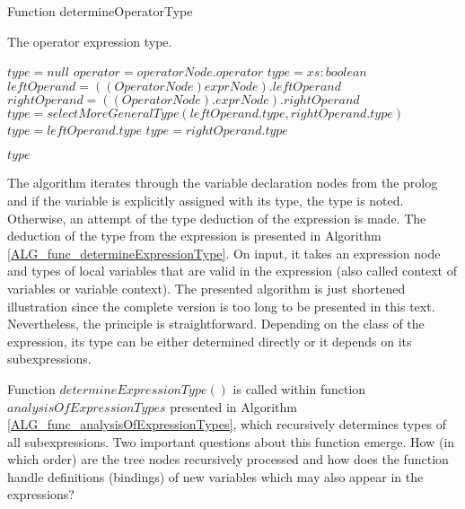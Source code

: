 
\begin{algorithm}
\caption{Function determineOperatorType}
\label{ALG_func_determineOperatorType}
\begin{algorithmic}[1]
\ENSURE The operator expression type.

\STATE $type = null$
\STATE $operator = operatorNode.operator$
    \STATE $type = xs:boolean$
    \STATE $leftOperand = ((OperatorNode)exprNode).leftOperand$
    \STATE $rightOperand = ((OperatorNode).exprNode).rightOperand$
        \STATE $type = selectMoreGeneralType(leftOperand.type, rightOperand.type)$
        \STATE $type = leftOperand.type$
        \STATE $type = rightOperand.type$
    \ENDIF
\ENDIF

\RETURN $type$
\end{algorithmic}
\end{algorithm}

The algorithm iterates through the variable declaration nodes from the prolog and if the variable is explicitly assigned with its type, the type is noted. Otherwise, an attempt of the type deduction of the expression is made. The deduction of the type from the expression is presented in Algorithm \ref{ALG_func_determineExpressionType}. On input, it takes an expression node and types of local variables that are valid in the expression (also called context of variables or variable context). The presented algorithm is just shortened illustration since the complete version is too long to be presented in this text. Nevertheless, the principle is straightforward. Depending on the class of the expression, its type can be either determined directly or it depends on its subexpressions. 

Function $determineExpressionType()$ is called within function $analysisOfExpressionTypes$ presented in Algorithm \ref{ALG_func_analysisOfExpressionTypes}, which recursively determines types of all subexpressions. Two important questions about this function emerge. How (in which order) are the tree nodes recursively processed and how does the function handle definitions (bindings) of new variables which may also appear in the expressions?

